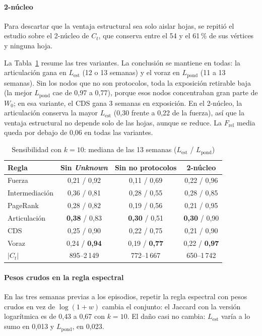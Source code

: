 \documentclass[journal]{IEEEtran}
\begin{document}
\paragraph{2-núcleo} Para descartar que la ventaja estructural sea solo aislar
hojas, se repitió el estudio sobre el 2-núcleo de $C_t$, que conserva entre el
54 y el 61\,\% de sus vértices y ninguna hoja.

La Tabla~\ref{tab:sens} resume las tres variantes. La conclusión se mantiene en
todas: la articulación gana en $L_{\mathrm{est}}$ (12 o 13 semanas) y el voraz
en $L_{\mathrm{pond}}$ (11 a 13 semanas). Sin los nodos que no son protocolos,
toda la exposición retirable baja (la mejor $L_{\mathrm{pond}}$ cae de 0{,}97 a
0{,}77), porque esos nodos concentraban gran parte de $W_0$; en esa variante, el
CDS gana 3 semanas en exposición. En el 2-núcleo, la articulación conserva la
mayor $L_{\mathrm{est}}$ (0{,}30 frente a 0{,}22 de la fuerza), así que la
ventaja estructural no depende solo de las hojas, aunque se reduce. La
$F_{\mathrm{rel}}$ media queda por debajo de 0{,}06 en todas las variantes.

\begin{table}[!t]
\renewcommand{\arraystretch}{1.2}
\caption{Sensibilidad con $k=10$: mediana de las 13 semanas
($L_{\mathrm{est}}$ / $L_{\mathrm{pond}}$)}
\label{tab:sens}
\centering
\setlength{\tabcolsep}{3pt}
\begin{tabular}{lccc}
\toprule
Regla & Sin \emph{Unknown} & Sin no protocolos & 2-núcleo \\
\midrule
Fuerza         & 0{,}21 / 0{,}92 & 0{,}11 / 0{,}69 & 0{,}22 / 0{,}96 \\
Intermediación & 0{,}36 / 0{,}81 & 0{,}28 / 0{,}55 & 0{,}28 / 0{,}85 \\
PageRank       & 0{,}28 / 0{,}82 & 0{,}19 / 0{,}56 & 0{,}21 / 0{,}95 \\
Articulación   & \textbf{0{,}38} / 0{,}83 & \textbf{0{,}30} / 0{,}51 & \textbf{0{,}30} / 0{,}90 \\
CDS            & 0{,}25 / 0{,}90 & 0{,}22 / 0{,}75 & 0{,}21 / 0{,}90 \\
Voraz          & 0{,}24 / \textbf{0{,}94} & 0{,}19 / \textbf{0{,}77} & 0{,}22 / \textbf{0{,}97} \\
\midrule
$|C_t|$        & 895--2\,149 & 772--1\,667 & 650--1\,742 \\
\bottomrule
\end{tabular}
\end{table}

\paragraph{Pesos crudos en la regla espectral} En las tres semanas previas a
los episodios, repetir la regla espectral con pesos crudos en vez de
$\log(1+w)$ cambia el conjunto: el Jaccard con la versión logarítmica es de
0{,}43 a 0{,}67 con $k=10$. El daño casi no cambia: $L_{\mathrm{est}}$ varía a
lo sumo en 0{,}013 y $L_{\mathrm{pond}}$, en 0{,}023.
\end{document}
